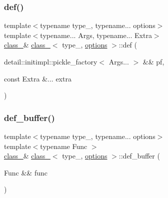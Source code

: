 \mbox{\label{classclass___a872d4b21283515f794739264673cd2d8}} 
\subsubsection{\texorpdfstring{def()}{def()}\hspace{0.1cm}{\footnotesize\ttfamily [6/6]}}
{\footnotesize\ttfamily template$<$typename type\+\_\+, typename... options$>$ \\
template$<$typename... Args, typename... Extra$>$ \\
\mbox{\hyperlink{classclass__}{class\+\_\+}}\& \mbox{\hyperlink{classclass__}{class\+\_\+}}$<$ type\+\_\+, \mbox{\hyperlink{classoptions}{options}} $>$\+::def (\begin{DoxyParamCaption}\item[{detail\+::initimpl\+::pickle\+\_\+factory$<$ Args... $>$ \&\&}]{pf,  }\item[{const Extra \&...}]{extra }\end{DoxyParamCaption})\hspace{0.3cm}{\ttfamily [inline]}}

\mbox{\label{classclass___acbd135c9fd33010bc99085e5d333bf55}} 
\subsubsection{\texorpdfstring{def\_buffer()}{def\_buffer()}\hspace{0.1cm}{\footnotesize\ttfamily [1/3]}}
{\footnotesize\ttfamily template$<$typename type\+\_\+, typename... options$>$ \\
template$<$typename Func $>$ \\
\mbox{\hyperlink{classclass__}{class\+\_\+}}\& \mbox{\hyperlink{classclass__}{class\+\_\+}}$<$ type\+\_\+, \mbox{\hyperlink{classoptions}{options}} $>$\+::def\+\_\+buffer (\begin{DoxyParamCaption}\item[{Func \&\&}]{func }\end{DoxyParamCaption})\hspace{0.3cm}{\ttfamily [inline]}}

